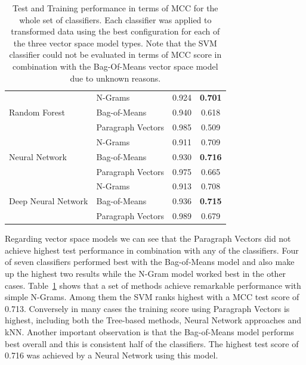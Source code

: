 \begin{table}[h]
\begin{center}
\begin{tabular}{ ll cc }
      \midrule
      \multirow{3}{*}{Random Forest}
       & N-Grams & 0.924 & \textbf{0.701} \\
       & Bag-of-Means & 0.940 & 0.618 \\
       & Paragraph Vectors & 0.985 & 0.509 \\
      \midrule
      \multirow{3}{*}{Neural Network}
       & N-Grams & 0.911 & 0.709 \\
       & Bag-of-Means & 0.930 & \textbf{0.716} \\
       & Paragraph Vectors & 0.975 & 0.665 \\
      \midrule
      \multirow{3}{*}{Deep Neural Network}
       & N-Grams & 0.913 & 0.708 \\
       & Bag-of-Means & 0.936 & \textbf{0.715} \\
       & Paragraph Vectors & 0.989 & 0.679 \\
      \bottomrule
    \end{tabular}
  \caption{Test and Training performance in terms of \gls{MCC} for the whole set of classifiers. Each classifier was applied to transformed data using the best configuration for each of the three vector space model types. Note that the SVM classifier could not be evaluated in terms of \gls{MCC} score in combination with the Bag-Of-Means vector space model due to unknown reasons.}
\label{tab:Classifier Results}
\end{center}
\end{table}

\clearpage

Regarding vector space models we can see that the Paragraph Vectors did not achieve highest test performance in combination with any of the classifiers. Four of seven classifiers performed best with the Bag-of-Means model and also make up the highest two results while the N-Gram model worked best in the other cases.
Table~\ref{tab:Classifier Results} shows that a set of methods achieve remarkable performance with simple N-Grams. Among them the SVM ranks highest with a \gls{MCC} test score of 0.713. Conversely in many cases the training score using Paragraph Vectors is highest, including both the Tree-based methods, Neural Network approaches and \gls{kNN}.
Another important observation is that the Bag-of-Means model performs best overall and this is consistent half of the classifiers. The highest test score of 0.716 was achieved by a Neural Network using this model.


